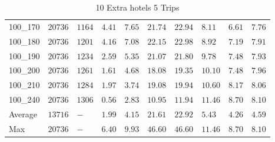 \begin{center}
\begin{table}[]
\begin{tabular}{|lll|l|l|ll|lll|}
100\_170& $20736$  & $1164$ & $4.41$ & $7.65$   & $21.74$ & $22.94$ & $8.11 $ & $6.61$ & $7.76$ \\
100\_180& $20736$  & $1201$ & $4.16$ & $7.08$   & $22.15$ & $22.98$ & $8.92 $ & $7.19$ & $7.91$ \\
100\_190& $20736$  & $1234$ & $2.59$ & $5.35$   & $21.07$ & $21.80$ & $9.78 $ & $7.48$ & $7.93$ \\
100\_200& $20736$  & $1261$ & $1.61$ & $4.68$   & $18.08$ & $19.35$ & $10.10$ & $7.48$ & $7.96$ \\
100\_210& $20736$  & $1284$ & $1.97$ & $3.74$   & $19.08$ & $19.94$ & $10.60$ & $8.17$ & $8.06$ \\
100\_240& $20736$  & $1306$ & $0.56$ & $2.83$   & $10.95$ & $11.94$ & $11.46$ & $8.70$ & $8.10$ \\
\hline
Average & $13716$  & $-   $ & $1.99$ & $4.15$   & $21.61$ & $22.92$ & $5.43 $ & $4.26$ & $4.59$ \\
Max     & $20736$  & $-   $ & $6.40$ & $9.93$   & $46.60$ & $46.60$ & $11.46$ & $8.70$ & $8.10$ \\
\hline
\end{tabular}
\caption{10 Extra hotels 5 Trips}
\label{10-5}
\end{table}
\end{center}
